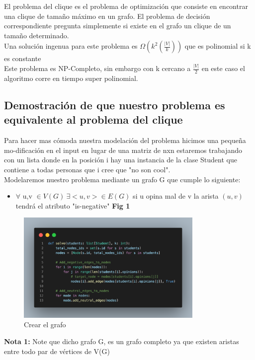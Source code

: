 \documentclass[sn-mathphys,Numbered]{sn-jnl}%
\theoremstyle{thmstyleone}%
\theoremstyle{thmstyletwo}%
\theoremstyle{thmstylethree}%
\begin{document}
El problema del clique es el problema de optimización que consiste en encontrar una clique de tamaño máximo en un grafo. El problema de decisión correspondiente pregunta simplemente si existe en el grafo un clique de un tamaño determinado.\\
Una solución ingenua para este problema es $\Omega (k^2(\frac{|V|}{k})) $ que es polinomial si k es constante\\
Este problema es NP-Completo, sin embargo con k cercano a $\frac{|V|}{2}$ en este caso el algoritmo corre en tiempo super polinomial.\cite{1}

\subsection {Demostraci\'on de que nuestro problema es equivalente al problema del clique}
Para hacer mas cómoda nuestra modelaci\'on del problema hicimos una peque\~na mo-dificaci\'on en el input en lugar de una matriz de nxn estaremos trabajando con un lista donde en la posición i hay una instancia de la clase Student que contiene a todas personas que i cree que "no son cool". \\
Modelaremos nuestro problema mediante un grafo G que cumple lo siguiente:
\begin{itemize}
    \item $\forall$ u,v $\in V(G) ~\exists <u,v> \in E(G) $ si u opina mal de v la arista $(u,v)$ tendr\'a el atributo "is-negative" \textbf{Fig 1}
\end{itemize}
\begin{figure}[h]
        \centering
        \includegraphics[height=0.3\textheight, width=0.8\textwidth]{build_graph.png}
        \centering
        \caption{Crear el grafo}
\end{figure}
\textbf{Nota 1:} Note que dicho grafo G, es un grafo completo ya que existen aristas entre todo par de vértices de V(G)\\
\end{document}
